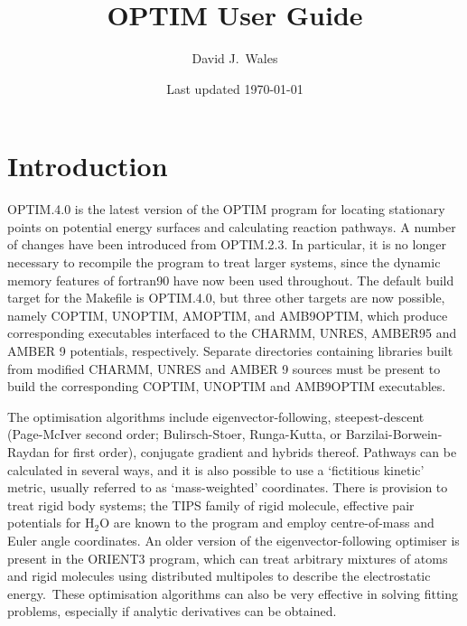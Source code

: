 \documentclass[12pt,a4paper,dvips]{article}
\begin{document}
% 

\title{OPTIM User Guide}
\author{David J.~Wales}
\date{Last updated \today}
\maketitle

\clearpage
{}
{} %
\tableofcontents

\section{Introduction}
\label{sec:intro}

OPTIM.4.0 is the latest version of the OPTIM program for locating stationary points on potential energy 
surfaces and calculating reaction pathways. \cite{Wales03}
A number of changes have been introduced from OPTIM.2.3.
In particular, it is no longer necessary to recompile the program to treat larger systems, since
the dynamic memory features of fortran90 have now been used throughout.
The default build target for the Makefile is OPTIM.4.0, but three other targets are now
possible, namely COPTIM, UNOPTIM, AMOPTIM, and AMB9OPTIM, which produce corresponding executables interfaced 
to the CHARMM,\cite{mackerellbbdeffgghjkklmmnnprrsssswwyk98,lazaridisk99}
UNRES,
AMBER95\cite{cornellcbgmfsfck95} and AMBER 9 potentials, respectively.
Separate directories containing libraries built from modified CHARMM, UNRES and AMBER 9 sources must 
be present to build the corresponding COPTIM, UNOPTIM and AMB9OPTIM executables.

The optimisation algorithms include eigenvector-following,
\cite{pancir74,cerjanm81,simonsjto83,onealts84,banerjeeass85,baker86,baker87} steepest-descent 
(Page-McIver second order; Bulirsch-Stoer, Runga-Kutta, or 
Barzilai-Borwein-Raydan\cite{BB-IMAJNA-1988,Raydan-SIAMJO-1997} for first order),
conjugate gradient and hybrids thereof.
Pathways can be calculated in several ways, and it is also possible to
use a `fictitious kinetic' metric,
usually referred to as `mass-weighted' coordinates.
There is provision to treat rigid body systems; the
TIPS family of rigid molecule, effective pair potentials for H$_2$O are known to
the program and employ centre-of-mass and Euler angle coordinates. An older
version of the eigenvector-following optimiser is present in the ORIENT3 program, which can treat 
arbitrary mixtures of atoms and rigid molecules using distributed multipoles to
describe the electrostatic energy.\cite{stone81,stonea85}\
These optimisation algorithms can also be
very effective in solving fitting problems, especially if analytic derivatives 
can be obtained.
\end{document}
